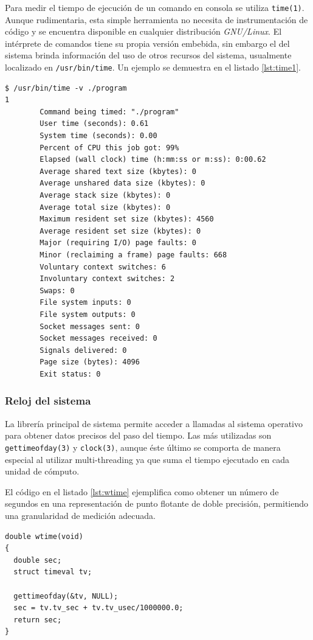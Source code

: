 \documentclass[a4paper]{report}
\begin{document}
Para medir el tiempo de ejecución de un comando en consola se utiliza {\tt time(1)}. Aunque rudimentaria, esta simple herramienta no necesita de instrumentación de código y
se encuentra disponible en cualquier distribución {\it GNU/Linux}.
El intérprete de comandos tiene su propia versión embebida, sin embargo el del sistema brinda información del uso de otros recursos del sistema, usualmente localizado en {\tt /usr/bin/time}.
Un ejemplo se demuestra en el listado \ref{lst:time1}.

\bigskip

\begin{lstlisting}[caption={Ejecución del Programa},label={lst:time1}]
$ /usr/bin/time -v ./program
1
        Command being timed: "./program"
        User time (seconds): 0.61
        System time (seconds): 0.00
        Percent of CPU this job got: 99%
        Elapsed (wall clock) time (h:mm:ss or m:ss): 0:00.62
        Average shared text size (kbytes): 0
        Average unshared data size (kbytes): 0
        Average stack size (kbytes): 0
        Average total size (kbytes): 0
        Maximum resident set size (kbytes): 4560
        Average resident set size (kbytes): 0
        Major (requiring I/O) page faults: 0
        Minor (reclaiming a frame) page faults: 668
        Voluntary context switches: 6
        Involuntary context switches: 2
        Swaps: 0
        File system inputs: 0
        File system outputs: 0
        Socket messages sent: 0
        Socket messages received: 0
        Signals delivered: 0
        Page size (bytes): 4096
        Exit status: 0
\end{lstlisting}

\subsubsection{Reloj del sistema}

La librería principal de sistema permite acceder a llamadas al sistema operativo para obtener datos precisos del paso del tiempo.
Las más utilizadas son {\tt gettimeofday(3)} y {\tt clock(3)}, aunque éste último se comporta de manera especial al utilizar multi-threading ya que suma el tiempo ejecutado en cada unidad de
cómputo.

\bigskip

El código en el listado \ref{lst:wtime} ejemplifica como obtener un número de segundos en una representación de punto flotante de doble precisión, permitiendo una granularidad de medición
adecuada.

\begin{lstlisting}[caption={Tiempo de Ejecución},label={lst:wtime}]
double wtime(void)
{
  double sec;
  struct timeval tv;
  
  gettimeofday(&tv, NULL);
  sec = tv.tv_sec + tv.tv_usec/1000000.0;
  return sec;
}
\end{lstlisting}
\end{document}
